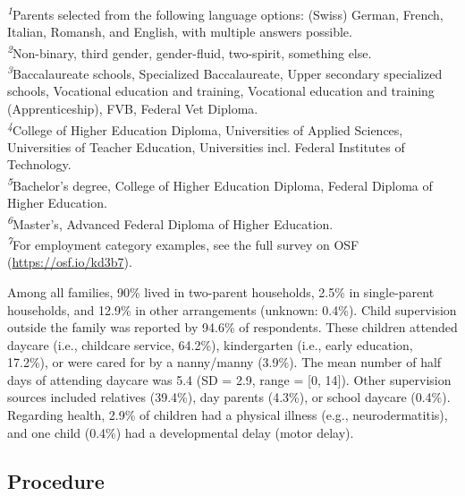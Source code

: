 \documentclass[
  man,
  floatsintext,
  longtable,
  nolmodern,
  notxfonts,
  notimes,
  colorlinks=true,linkcolor=blue,citecolor=blue,urlcolor=blue]{apa7}
\begin{document}
\hspace*{-\parindent}\begin{minipage}{\linewidth}
\textsuperscript{\textit{1}}Parents selected from the following language options: (Swiss) German, French, Italian, Romansh, and English, with multiple answers possible.\\
\textsuperscript{\textit{2}}Non-binary, third gender, gender-fluid, two-spirit, something else.\\
\textsuperscript{\textit{3}}Baccalaureate schools, Specialized Baccalaureate, Upper secondary specialized schools, Vocational education and training, Vocational education and training (Apprenticeship), FVB, Federal Vet Diploma.\\
\textsuperscript{\textit{4}}College of Higher Education Diploma, Universities of Applied Sciences, Universities of Teacher Education, Universities incl. Federal Institutes of Technology.\\
\textsuperscript{\textit{5}}Bachelor's degree, College of Higher Education Diploma, Federal Diploma of Higher Education.\\
\textsuperscript{\textit{6}}Master's, Advanced Federal Diploma of Higher Education.\\
\textsuperscript{\textit{7}}For employment category examples, see the full survey on OSF (\url{https://osf.io/kd3b7}).\\
\end{minipage}
\endgroup

Among all families, 90\% lived in two-parent households, 2.5\% in
single-parent households, and 12.9\% in other arrangements (unknown:
0.4\%). Child supervision outside the family was reported by 94.6\% of
respondents. These children attended daycare (i.e., childcare service,
64.2\%), kindergarten (i.e., early education, 17.2\%), or were cared for
by a nanny/manny (3.9\%). The mean number of half days of attending
daycare was 5.4 (SD = 2.9, range = {[}0, 14{]}). Other supervision
sources included relatives (39.4\%), day parents (4.3\%), or school
daycare (0.4\%). Regarding health, 2.9\% of children had a physical
illness (e.g., neurodermatitis), and one child (0.4\%) had a
developmental delay (motor delay).

\subsection{Procedure}\label{procedure}
\end{document}
